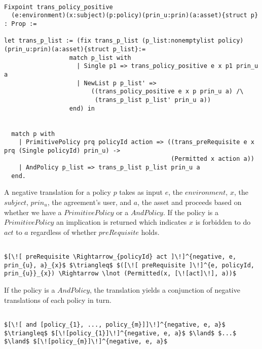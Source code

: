 \begin{lstlisting}

Fixpoint trans_policy_positive
  (e:environment)(x:subject)(p:policy)(prin_u:prin)(a:asset){struct p} : Prop :=

let trans_p_list := (fix trans_p_list (p_list:nonemptylist policy)(prin_u:prin)(a:asset){struct p_list}:=
                  match p_list with
                    | Single p1 => trans_policy_positive e x p1 prin_u a
                    | NewList p p_list' => 
                        ((trans_policy_positive e x p prin_u a) /\ 
                         (trans_p_list p_list' prin_u a))
                  end) in


  match p with
    | PrimitivePolicy prq policyId action => ((trans_preRequisite e x prq (Single policyId) prin_u) ->
                                              (Permitted x action a))
    | AndPolicy p_list => trans_p_list p_list prin_u a
  end.
\end{lstlisting}


A negative translation for a policy $p$ takes as input $e$, the $environment$, $x$, the $subject$, $prin_{u}$, the agreement's user, and $a$, the asset and proceeds based on whether we have a $PrimitivePolicy$ or a $AndPolicy$. If the policy is a $PrimitivePolicy$ an implication is returned which indicates $x$ is forbidden to do $act$ to $a$ regardless of whether $preRequisite$ holds.


\lstset{mathescape, language=AST}  
\begin{lstlisting}[frame=single, caption={Negative Policy Translation {$\colon$} Single policy},label={lst:transpolicynegativeSingle}]

$[\![ preRequisite \Rightarrow_{policyId} act ]\!]^{negative, e, prin_{u}, a}_{x}$ $\triangleq$ $([\![ preRequisite ]\!]^{e, policyId, prin_{u}}_{x}) \Rightarrow \lnot (Permitted(x, [\![act]\!], a))$
\end{lstlisting}

If the policy is a $AndPolicy$, the translation yields a conjunction of negative translations of each policy in turn.

\lstset{mathescape, language=AST}  
\begin{lstlisting}[frame=single, caption={Negative Policy Translation {$\colon$} List of policies},label={lst:transpolicynegativeListOfPolicies}]

$[\![ and [policy_{1}, ..., policy_{m}]]\!]^{negative, e, a}$ $\triangleq$ $[\![policy_{1}]\!]^{negative, e, a}$ $\land$ $...$ $\land$ $[\![policy_{m}]\!]^{negative, e, a}$


\end{lstlisting}

